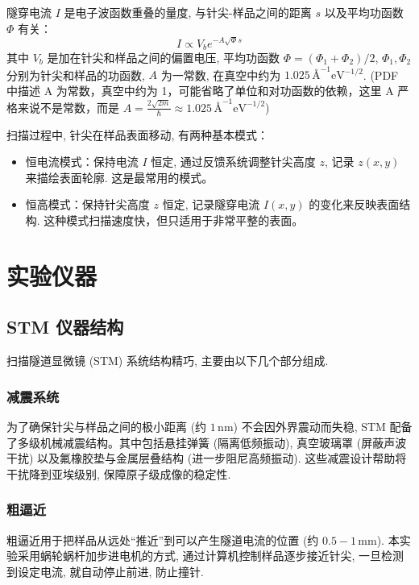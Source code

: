 \documentclass{whureport}
\begin{document}
\begin{multicols}{2}
隧穿电流 \( I \) 是电子波函数重叠的量度, 与针尖-样品之间的距离 \( s \) 以及平均功函数 \( \Phi \) 有关：
\[ I \propto V_b e^{-A\sqrt{\Phi}s} \] %
其中 \( V_b \) 是加在针尖和样品之间的偏置电压, 平均功函数 \( \Phi = (\Phi_1 + \Phi_2)/2 \), \( \Phi_1, \Phi_2 \) 分别为针尖和样品的功函数, \( A \) 为一常数, 在真空中约为 \( 1.025 \, \text{Å}^{-1}\text{eV}^{-1/2} \). (PDF 中描述 A 为常数，真空中约为 1，可能省略了单位和对功函数的依赖，这里 A 严格来说不是常数，而是 \( A = \frac{2\sqrt{2m}}{\hbar} \approx 1.025 \, \text{Å}^{-1}\text{eV}^{-1/2} \))

扫描过程中, 针尖在样品表面移动, 有两种基本模式：
\begin{itemize}
    \item 恒电流模式：保持电流 \( I \) 恒定, 通过反馈系统调整针尖高度 \( z \), 记录 \( z(x, y) \) 来描绘表面轮廓. 这是最常用的模式。
    \item 恒高模式：保持针尖高度 \( z \) 恒定, 记录隧穿电流 \( I(x, y) \) 的变化来反映表面结构. 这种模式扫描速度快，但只适用于非常平整的表面。
\end{itemize}

\section{实验仪器}
\subsection{STM 仪器结构}
扫描隧道显微镜 (STM) 系统结构精巧, 主要由以下几个部分组成.

\subsubsection{减震系统}
为了确保针尖与样品之间的极小距离 (约 \( 1 \, \text{nm} \)) 不会因外界震动而失稳, STM 配备了多级机械减震结构。其中包括悬挂弹簧 (隔离低频振动), 真空玻璃罩 (屏蔽声波干扰) 以及氟橡胶垫与金属层叠结构 (进一步阻尼高频振动). 这些减震设计帮助将干扰降到亚埃级别, 保障原子级成像的稳定性.

\subsubsection{粗逼近}
粗逼近用于把样品从远处“推近”到可以产生隧道电流的位置 (约 \( 0.5-1 \, \text{mm} \)). 本实验采用蜗轮蜗杆加步进电机的方式, 通过计算机控制样品逐步接近针尖, 一旦检测到设定电流, 就自动停止前进, 防止撞针.


\end{multicols}
\end{document}
